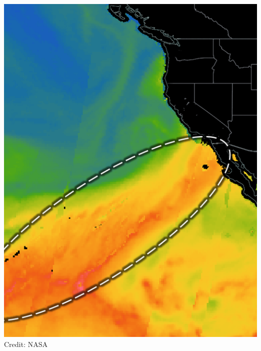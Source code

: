\documentclass[aspectratio=169,10pt]{beamer}
\begin{document}
\begin{frame}
\begin{minipage}{.25\textwidth}
    \includegraphics[width=\textwidth]{./ch1/images/ar}\\
    {\scriptsize Credit: NASA}
   \end{minipage}
\end{frame} %
\end{document}
